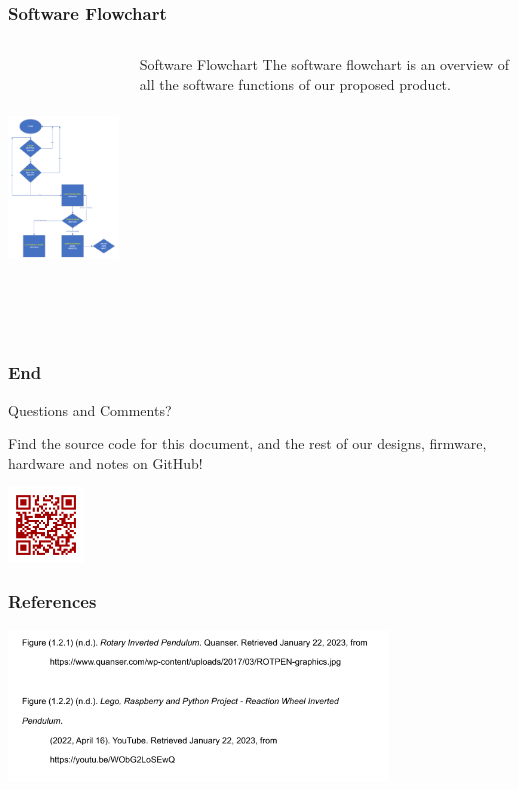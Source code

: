 \documentclass[aspectratio=169]{beamer}
\begin{document}
\begin{frame}
    \frametitle{Software Flowchart}

    \begin{columns}
        \begin{column}{0.50\textwidth}
            \includegraphics[height=7cm]{SoftwareFlowchart}
        \end{column}

        \begin{column}{0.40\textwidth}
            \begin{block}{Software Flowchart}
                The software flowchart is an overview of all the software functions of our
                proposed product.
            \end{block}
        \end{column}
    \end{columns}
\end{frame}

\begin{frame}
    \frametitle{End}

    \begin{block}{}
        \begin{center}
            \Huge Questions and Comments?
        \end{center}
    \end{block}

    \begin{center}
        Find the source code for this document, and the rest of our designs, firmware, hardware
        and notes on GitHub!

        \includegraphics[height=2cm]{github_qr}
    \end{center}
\end{frame}

\begin{frame}
    \frametitle{References}

    \includegraphics[height=4cm]{references}
\end{frame}
\end{document}
